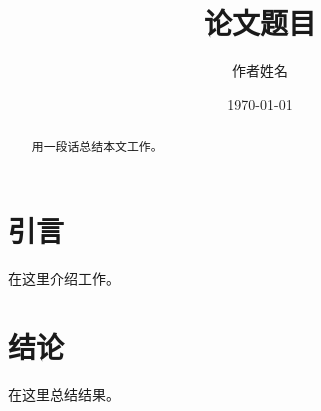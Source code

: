 \documentclass[12pt]{report}
\title{论文题目}
\author{作者姓名}
\date{\today}
\begin{document}
\maketitle

\begin{abstract}
用一段话总结本文工作。
\end{abstract}

\tableofcontents

\chapter{引言}
在这里介绍工作。

\chapter{结论}
在这里总结结果。
\end{document}
